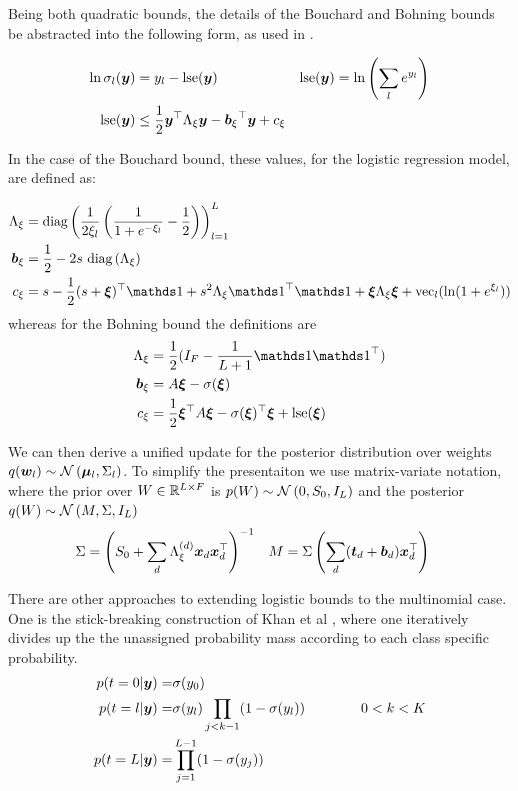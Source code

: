 Being both quadratic bounds, the details of the Bouchard and Bohning bounds be abstracted into the following form, as used in \cite{Khan2010}.

\begin{align}
\ln \sigma_l(\bm y) & = y_l - \text{lse} (\bm y) & \text{lse} (\bm y) & = \ln \left(\sum_l e^{y_l} \right)\\
\text{lse}(\bm y) & \leq \frac{1}{2} \bm y^\top { \Lambda_{\xi} } \bm y - { \bm b_{\xi} }^\top\bm y + { c_{\xi} }
\end{align}

In the case of the Bouchard bound, these values, for the logistic regression model, are defined as:

\begin{align}
\Axi & = \diag{\frac{1}{2\xi_l} \left( \frac{1}{1 + e^{-\xi_l}} - \half\right) }_{l=1}^L  \\
\bxi & = \half - 2 s \text{ }\diag{\Axi} \\
\cxi & = s - \half (s + \vv{\xi})\T\one + s^2\Axi \one\T\one + \vv{\xi}\Axi\vv{\xi} + \text{vec}_l(\ln (1 + e^{\xi_l}))
\end{align}
whereas for the Bohning bound the definitions are
\begin{align}
\Axi & = \half (I_F - \frac{1}{L+1} \one \one \T) \\
\bxi & = A \vv{\xi} - \sigma(\vv{\xi})\\
\cxi & = \half \vv{\xi}\T A \vv{\xi} - \sigma(\vv{\xi})\T\vv{\xi} + \lse(\vv{\xi})
\end{align}

We can then derive a unified update for the posterior distribution over weights $q(\bm w_l) \sim \mathcal{N} \left( {\bm \mu_l}, {\Sigma_l} \right)$. To simplify the presentaiton we use matrix-variate notation, where the prior over $W \in { \mathbb{R}^{L \times F} }$ is $p(W) \sim \mathcal{N} \left(0, S_0, I_L\right)$ and the posterior $q(W) \sim \mathcal{N} \left(M, \Sigma, I_L\right)$
\begin{align}
\Sigma &= {\left( S_0 + \sum_d \Lambda_\xi^{(d)}\bm x_d\bm x_d^\top \right)}^{-1} & M &= \Sigma \left(\sum_d (\bm t_d + \bm b_d)\bm x_d^\top\right)
\end{align}


\newcommand \C { \mathcal{C} }

There are other approaches to extending logistic bounds to the multinomial case. One is the stick-breaking construction of Khan et al \cite{Khan2012stick}, where one iteratively divides up the the unassigned probability mass according to each class specific probability.
\begin{align}
\begin{split}
p(t = 0 | \bm y) = & \sigma(y_0) \\
p(t = l | \bm y) = & \sigma(y_l) \prod_{j < k - 1} (1 - \sigma(y_l)) \qquad\qquad 0 < k < K \\
p (t = L | \bm y) = & \prod_{j = 1}^{L - 1} (1 - \sigma(y_j))
\end{split}
\end{align}

